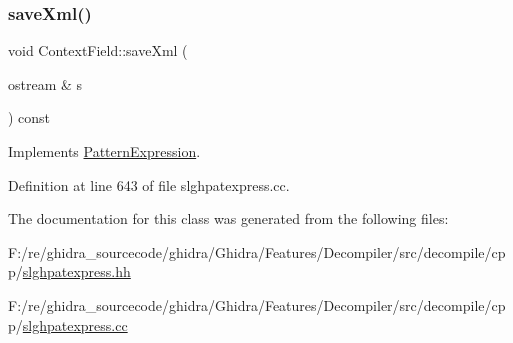 \subsubsection{\texorpdfstring{saveXml()}{saveXml()}}
{\footnotesize\ttfamily void Context\+Field\+::save\+Xml (\begin{DoxyParamCaption}\item[{ostream \&}]{s }\end{DoxyParamCaption}) const\hspace{0.3cm}{\ttfamily [virtual]}}



Implements \mbox{\hyperlink{class_pattern_expression_a0d9c89ffbf4a22fac68189a845cde92a}{Pattern\+Expression}}.



Definition at line 643 of file slghpatexpress.\+cc.



The documentation for this class was generated from the following files\+:\begin{DoxyCompactItemize}
\item 
F\+:/re/ghidra\+\_\+sourcecode/ghidra/\+Ghidra/\+Features/\+Decompiler/src/decompile/cpp/\mbox{\hyperlink{slghpatexpress_8hh}{slghpatexpress.\+hh}}\item 
F\+:/re/ghidra\+\_\+sourcecode/ghidra/\+Ghidra/\+Features/\+Decompiler/src/decompile/cpp/\mbox{\hyperlink{slghpatexpress_8cc}{slghpatexpress.\+cc}}\end{DoxyCompactItemize}
